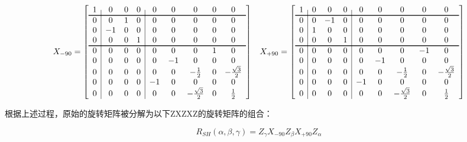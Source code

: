 \begin{fullwidth}
\begin{equation}
\begin{aligned}
	X_{-90}=\left[
	\centering
	\begin{array}{c|ccc|ccccc}
		1 & 0 & 0 & 0 & 0 & 0 & 0 & 0 & 0  \\
		\hline
		0 & 0 & 1 & 0 & 0 & 0 & 0 & 0 & 0  \\
		0 & -1 & 0 & 0 & 0 & 0 & 0 & 0 & 0 \\
		0 & 0 & 0 & 1 & 0 & 0 & 0 & 0 & 0  \\
		\hline
		0 & 0 & 0 & 0 & 0 & 0 & 0 & 1 & 0  \\
		0 & 0 & 0 & 0 & 0 & -1 & 0 & 0 & 0  \\
		0 & 0 & 0 & 0 & 0 & 0 & -\frac{1}{2} & 0 & -\frac{\sqrt{3}}{2}  \\
		0 & 0 & 0 & 0 & -1 & 0 & 0 & 0 & 0  \\
		0 & 0 & 0 & 0 & 0 & 0 & -\frac{\sqrt{3}}{2} & 0 & \frac{1}{2}  \\
	\end{array}
	\right] && 
	X_{+90}=\left[
	\centering
	\begin{array}{c|ccc|ccccc}
		1 & 0 & 0 & 0 & 0 & 0 & 0 & 0 & 0  \\
		\hline
		0 & 0 & -1 & 0 & 0 & 0 & 0 & 0 & 0  \\
		0 & 1 & 0 & 0 & 0 & 0 & 0 & 0 & 0 \\
		0 & 0 & 0 & 1 & 0 & 0 & 0 & 0 & 0  \\
		\hline
		0 & 0 & 0 & 0 & 0 & 0 & 0 & -1 & 0  \\
		0 & 0 & 0 & 0 & 0 & -1 & 0 & 0 & 0  \\
		0 & 0 & 0 & 0 & 0 & 0 & -\frac{1}{2} & 0 & -\frac{\sqrt{3}}{2}  \\
		0 & 0 & 0 & 0 & -1 & 0 & 0 & 0 & 0  \\
		0 & 0 & 0 & 0 & 0 & 0 & -\frac{\sqrt{3}}{2} & 0 & \frac{1}{2}  \\
	\end{array}
	\right]
\end{aligned}
\end{equation}
\end{fullwidth}

根据上述过程，原始的旋转矩阵被分解为以下ZXZXZ的旋转矩阵的组合：

\begin{equation}
	R_{SH}(\alpha,\beta,\gamma)=Z_{\gamma}X_{-90}Z_{\beta}X_{+90}Z_{\alpha}
\end{equation}

